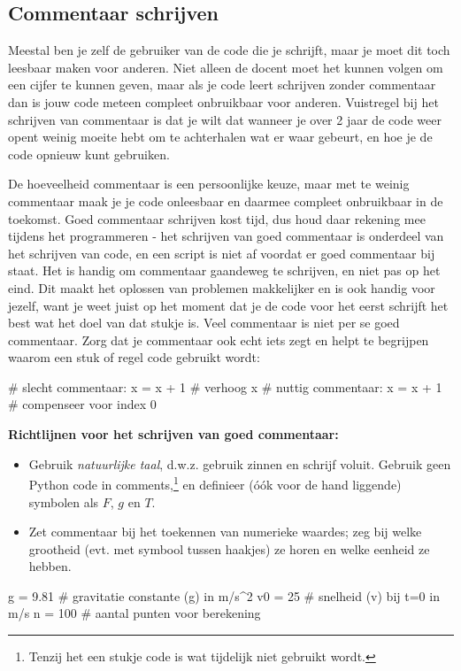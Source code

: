 \documentclass[a4paper,11pt, fleqn]{article}
\begin{document}
\subsection{Commentaar schrijven}
Meestal ben je zelf de gebruiker van de code die je schrijft, maar je moet dit toch leesbaar maken voor anderen. Niet alleen de docent moet het kunnen volgen om een cijfer te kunnen geven, maar als je code leert schrijven zonder commentaar dan is jouw code meteen compleet onbruikbaar voor anderen. Vuistregel bij het schrijven van commentaar is dat je wilt dat wanneer je over 2 jaar de code weer opent weinig moeite hebt om te achterhalen wat er waar gebeurt, en hoe je de code opnieuw kunt gebruiken.

De hoeveelheid commentaar is een persoonlijke keuze, maar met te weinig commentaar maak je je code onleesbaar en daarmee compleet onbruikbaar in de toekomst. Goed commentaar schrijven kost tijd, dus houd daar rekening mee tijdens het programmeren - het schrijven van goed commentaar is onderdeel van het schrijven van code, en een script is niet af voordat er goed commentaar bij staat. Het is handig om commentaar gaandeweg te schrijven, en niet pas op het eind. Dit maakt het oplossen van problemen makkelijker en is ook handig voor jezelf, want je weet juist op het moment dat je de code voor het eerst schrijft het best wat het doel van dat stukje is.
Veel commentaar is niet per se goed commentaar. Zorg dat je commentaar ook echt iets zegt en helpt te begrijpen waarom een stuk of regel code gebruikt wordt:
\begin{python}
# slecht commentaar:
x = x + 1         # verhoog x
# nuttig commentaar:
x = x + 1         # compenseer voor index 0
\end{python}

\textbf{Richtlijnen voor het schrijven van goed commentaar:}
\begin{itemize}
\item Gebruik \textit{natuurlijke taal}, d.w.z. gebruik zinnen en schrijf voluit. Gebruik geen Python code in comments,\footnote{Tenzij het een stukje code is wat tijdelijk niet gebruikt wordt.} en definieer (\'o\'ok voor de hand liggende) symbolen als $F$, $g$ en $T$.
\item Zet commentaar bij het toekennen van numerieke waardes; zeg bij welke grootheid (evt. met symbool tussen haakjes) ze horen en welke eenheid ze hebben.
\end{itemize}

	\begin{python}
	g = 9.81      # gravitatie constante (g) in m/s^2
	v0 = 25       # snelheid (v) bij t=0 in m/s
	n = 100       # aantal punten voor berekening
	\end{python}
\end{document}
